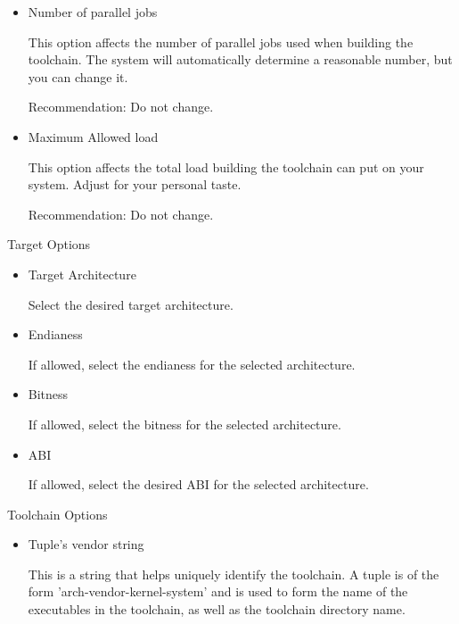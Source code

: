 \begin{description}
\begin{description}
\begin{itemize}
        Recommendation: Unselect

      \item{Number of parallel jobs}

        This option affects the number of parallel jobs used when
        building the toolchain.  The system will automatically
        determine a reasonable number, but you can change it.


        Recommendation: Do not change.

      \item{Maximum Allowed load}

        This option affects the total load building the toolchain can put on
        your system.  Adjust for your personal taste.

        Recommendation: Do not change.

      \end{itemize}

    \item{Target Options}
      \begin{itemize}
      \item{Target Architecture}

        Select the desired target architecture.

      \item{Endianess}

        If allowed, select the endianess for the selected architecture.

      \item{Bitness}

        If allowed, select the bitness for the selected architecture.

      \item{ABI}

        If allowed, select the desired ABI for the selected architecture.

      \end{itemize}

    \item{Toolchain Options}

      \begin{itemize}
      \item{Tuple's vendor string}

        This is a string that helps uniquely identify the toolchain.
        A tuple is of the form 'arch-vendor-kernel-system' and is used
        to form the name of the executables in the toolchain, as well
        as the toolchain directory name.


\end{itemize}
\end{description}
\end{description}

